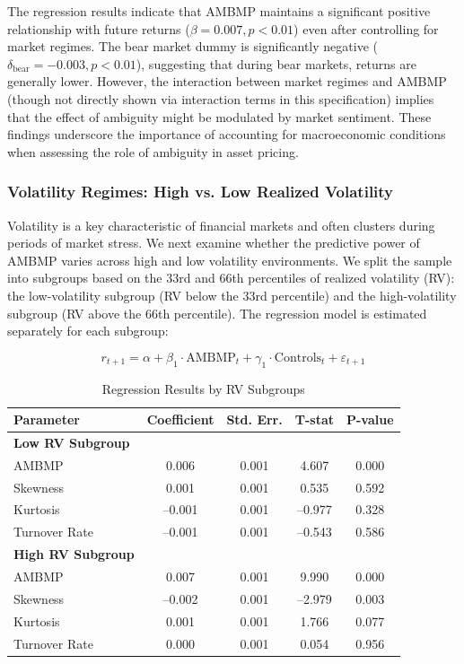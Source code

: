 \documentclass[preprint,12pt,authoryear]{elsarticle}
\begin{document}
The regression results indicate that AMBMP maintains a significant positive relationship with future returns ($\beta = 0.007, p < 0.01$) even after controlling for market regimes. The bear market dummy is significantly negative ($\delta_{\text{bear}} = -0.003, p < 0.01$), suggesting that during bear markets, returns are generally lower. However, the interaction between market regimes and AMBMP (though not directly shown via interaction terms in this specification) implies that the effect of ambiguity might be modulated by market sentiment. These findings underscore the importance of accounting for macroeconomic conditions when assessing the role of ambiguity in asset pricing.

\subsubsection{Volatility Regimes: High vs. Low Realized Volatility} \label{subsec:volatility_regimes}

Volatility is a key characteristic of financial markets and often clusters during periods of market stress. We next examine whether the predictive power of AMBMP varies across high and low volatility environments. We split the sample into subgroups based on the 33rd and 66th percentiles of realized volatility (RV): the low-volatility subgroup (RV below the 33rd percentile) and the high-volatility subgroup (RV above the 66th percentile). The regression model is estimated separately for each subgroup:

\begin{equation}
r_{t+1} = \alpha + \beta_1 \cdot \mathrm{AMBMP}_t + \gamma_1 \cdot \mathrm{Controls}_t + \varepsilon_{t+1}
\end{equation}

\begin{table}[h!]
\centering
\caption{Regression Results by RV Subgroups}
\label{tab:rv_subgroup_results}
\begin{tabular}{lcccc}
\toprule
\textbf{Parameter} & \textbf{Coefficient} & \textbf{Std. Err.} & \textbf{T-stat} & \textbf{P-value} \\
\midrule
\textbf{Low RV Subgroup} & & & & \\
AMBMP & 0.006 & 0.001 & 4.607 & 0.000 \\
Skewness & 0.001 & 0.001 & 0.535 & 0.592 \\
Kurtosis & –0.001 & 0.001 & –0.977 & 0.328 \\
Turnover Rate & –0.001 & 0.001 & –0.543 & 0.586 \\
\midrule
\textbf{High RV Subgroup} & & & & \\
AMBMP & 0.007 & 0.001 & 9.990 & 0.000 \\
Skewness & –0.002 & 0.001 & –2.979 & 0.003 \\
Kurtosis & 0.001 & 0.001 & 1.766 & 0.077 \\
Turnover Rate & 0.000 & 0.001 & 0.054 & 0.956 \\
\bottomrule
\end{tabular}
\end{table}
\end{document}
